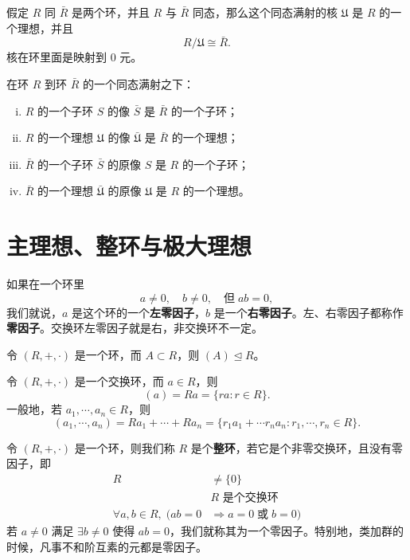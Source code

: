 \begin{theorem}
假定 $R$ 同 $\bar{R}$ 是两个环，并且 $R$ 与 $\bar{R}$ 同态，那么这个同态满射的核 $\mathfrak{U}$ 是 $R$ 的一个理想，并且
\[
R/\mathfrak{U}\cong\bar{R}.
\]
核在环里面是映射到 $0$ 元。
\end{theorem}

\begin{theorem}[定理 3：$R$ 和 $R$ 的商环同态满射的性质，传递]
在环 $R$ 到环 $\bar{R}$ 的一个同态满射之下：
\begin{enumerate}[(i)]
  \item $R$ 的一个子环 $S$ 的像 $\bar{S}$ 是 $\bar{R}$ 的一个子环；
  \item $R$ 的一个理想 $\mathfrak{U}$ 的像 $\bar{\mathfrak{U}}$ 是 $\bar{R}$ 的一个理想；
  \item $\bar{R}$ 的一个子环 $\bar{S}$ 的原像 $S$ 是 $R$ 的一个子环；
  \item $\bar{R}$ 的一个理想 $\bar{\mathfrak{U}}$ 的原像 $\mathfrak{U}$ 是 $R$ 的一个理想。
\end{enumerate}
\end{theorem}

\section{主理想、整环与极大理想}

\begin{definition}
如果在一个环里
\[
a\ne 0,\quad b\ne 0,\quad\text{但}\;ab=0,
\]
我们就说，$a$ 是这个环的一个\textbf{左零因子}，$b$ 是一个\textbf{右零因子}。左、右零因子都称作\textbf{零因子}。交换环左零因子就是右，非交换环不一定。
\end{definition}

\begin{proposition}[命题 2.10：由子集生成的理想仍是理想]
令 $(R,+,\cdot)$ 是一个环，而 $A\subset R$，则 $(A)\trianglelefteq R$。
\end{proposition}

\begin{proposition}[命题 2.11：交换环中主理想的表达式]
令 $(R,+,\cdot)$ 是一个交换环，而 $a\in R$，则
\[
(a)=Ra=\{ra:r\in R\}.
\]
一般地，若 $a_1,\cdots,a_n\in R$，则
\[
(a_1,\cdots,a_n)=Ra_1+\cdots+Ra_n=\{r_1a_1+\cdots r_na_n:r_1,\cdots,r_n\in R\}.
\]
\end{proposition}

\begin{definition}[定义 2.18：整环没有零因子是交换环]
令 $(R,+,\cdot)$ 是一个环，则我们称 $R$ 是个\textbf{整环}，若它是个非零交换环，且没有零因子，即
\begin{align}
R&\ne\{0\}\\
&R\text{ 是个交换环}\\
\forall a,b\in R,\;(ab=0&\Longrightarrow a=0\;\text{或}\;b=0)
\end{align}
若 $a\ne 0$ 满足 $\exists b\ne 0$ 使得 $ab=0$，我们就称其为一个零因子。特别地，类加群的时候，凡事不和阶互素的元都是零因子。
\end{definition}


